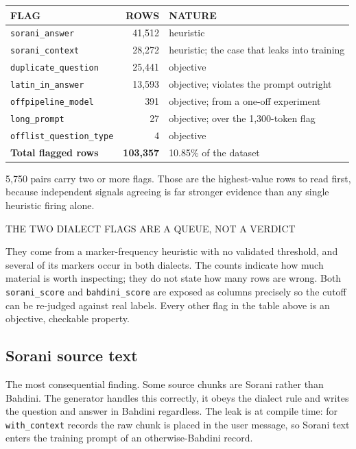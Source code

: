 \documentclass[10pt,a4paper]{article}
\newcommand{\codeid}[1]{\texttt{\footnotesize\color{inksoft}#1}}
\newcommand{\tablehead}[1]{{\uimed\fontsize{6.8}{8}\selectfont\color{crail}\mbox{#1}}}
\begin{document}
\begin{tabularx}{\textwidth}{@{}p{4.6cm}rL@{}}
\tablehead{FLAG} & \tablehead{ROWS} & \tablehead{NATURE}\\
\midrule
\codeid{sorani\_answer} & 41,512 & heuristic\\
\codeid{sorani\_context} & 28,272 & heuristic; the case that leaks into training\\
\codeid{duplicate\_question} & 25,441 & objective\\
\codeid{latin\_in\_answer} & 13,593 & objective; violates the prompt outright\\
\codeid{offpipeline\_model} & 391 & objective; from a one-off experiment\\
\codeid{long\_prompt} & 27 & objective; over the 1,300-token flag\\
\codeid{offlist\_question\_type} & 4 & objective\\
\midrule
\textbf{Total flagged rows} & \textbf{103,357} & 10.85\% of the dataset\\
\bottomrule
\end{tabularx}

\vspace{0.6em}
5,750 pairs carry two or more flags. Those are the highest-value rows to read
first, because independent signals agreeing is far stronger evidence than any
single heuristic firing alone.

\begin{warmcard}
{\uimed\fontsize{8.5}{11}\selectfont\color{crail}THE TWO DIALECT FLAGS ARE A QUEUE, NOT A VERDICT}\par\vspace{0.3em}
They come from a marker-frequency heuristic with no validated threshold, and
several of its markers occur in both dialects. The counts indicate how much
material is worth inspecting; they do not state how many rows are wrong. Both
\codeid{sorani\_score} and \codeid{bahdini\_score} are exposed as columns
precisely so the cutoff can be re-judged against real labels. Every other flag
in the table above is an objective, checkable property.
\end{warmcard}

\subsection{Sorani source text}

The most consequential finding. Some source chunks are Sorani rather than
Bahdini. The generator handles this correctly, it obeys the dialect rule and
writes the question and answer in Bahdini regardless. The leak is at compile
time: for \codeid{with\_context} records the raw chunk is placed in the user
message, so Sorani text enters the training prompt of an otherwise-Bahdini
record.
\end{document}
